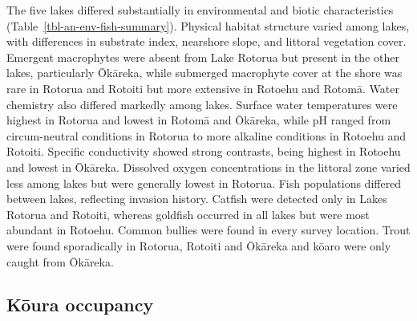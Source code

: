 \documentclass[
  12pt,
  a4paper,
  oneside]{scrbook}
\begin{document}
The five lakes differed substantially in environmental and biotic
characteristics ({Table~\ref{tbl-an-env-fish-summary}}). Physical
habitat structure varied among lakes, with differences in substrate
index, nearshore slope, and littoral vegetation cover. Emergent
macrophytes were absent from Lake Rotorua but present in the other
lakes, particularly Ōkāreka, while submerged macrophyte cover at the
shore was rare in Rotorua and Rotoiti but more extensive in Rotoehu and
Rotomā. Water chemistry also differed markedly among lakes. Surface
water temperatures were highest in Rotorua and lowest in Rotomā and
Ōkāreka, while pH ranged from circum-neutral conditions in Rotorua to
more alkaline conditions in Rotoehu and Rotoiti. Specific conductivity
showed strong contrasts, being highest in Rotoehu and lowest in Ōkāreka.
Dissolved oxygen concentrations in the littoral zone varied less among
lakes but were generally lowest in Rotorua. Fish populations differed
between lakes, reflecting invasion history. Catfish were detected only
in Lakes Rotorua and Rotoiti, whereas goldfish occurred in all lakes but
were most abundant in Rotoehu. Common bullies were found in every survey
location. Trout were found sporadically in Rotorua, Rotoiti and Ōkāreka
and kōaro were only caught from Ōkāreka.

\subsection{Kōura occupancy}\label{kux14dura-occupancy}
\end{document}
